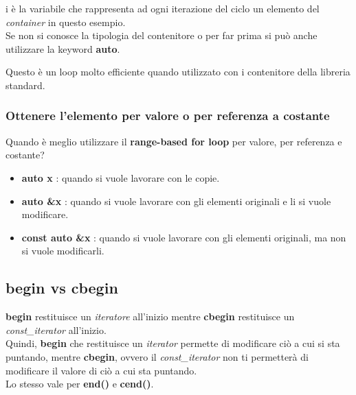\textsf{\small i è la variabile che rappresenta ad ogni iterazione del ciclo un elemento del \emph{container} in questo esempio.} \\

\textsf{\small Se non si conosce la tipologia del contenitore o per far prima si può anche utilizzare la keyword \textbf{auto}.} \break

\textsf{\small Questo è un loop molto efficiente quando utilizzato con i contenitore della libreria standard.} \\

\subsubsection{Ottenere l'elemento per valore o per referenza a costante}

\textsf{\small Quando è meglio utilizzare il \textbf{range-based for loop} per valore, per referenza e costante? } \\

\begin{itemize}
	\item \textsf{\small \textbf{auto x} : quando si vuole lavorare con le copie.}
	\item \textsf{\small \textbf{auto \&x} : quando si vuole lavorare con gli elementi originali e li si vuole modificare.}
	\item \textsf{\small \textbf{const auto \&x} : quando si vuole lavorare con gli elementi originali, ma non si vuole modificarli.}
\end{itemize}


\subsection{begin vs cbegin}

\textsf{\small \textbf{begin} restituisce un \emph{iteratore} all'inizio mentre \textbf{cbegin} restituisce un \emph{const\_iterator} all'inizio. } \\

\textsf{\small Quindi, \textbf{begin} che restituisce un \emph{iterator} permette di modificare ciò a cui si sta puntando, mentre \textbf{cbegin}, ovvero il \emph{const\_iterator} non ti permetterà di modificare il valore di ciò a cui sta puntando.} \\

\textsf{\small Lo stesso vale per \textbf{end()} e \textbf{cend()}.} \\

